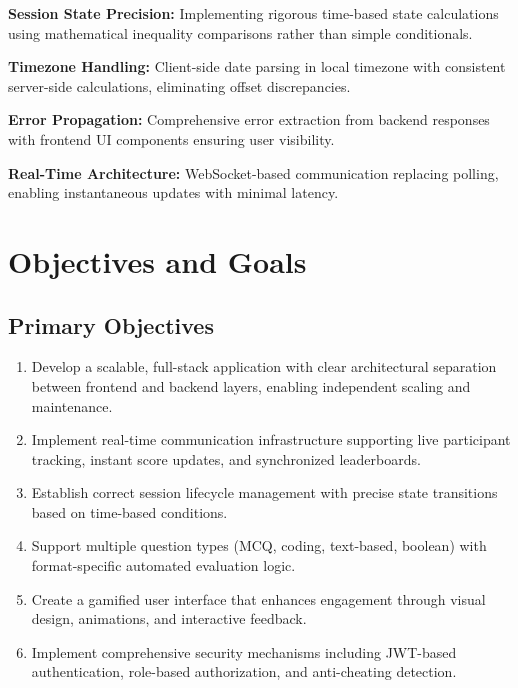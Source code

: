 \documentclass[12pt,a4paper]{report}
\newenvironment{reqbox}{%
  \begin{tcolorbox}[colback=lightgray,colframe=rulecol,
    leftrule=3pt,rightrule=0.4pt,toprule=0.4pt,bottomrule=0.4pt,
    arc=2pt,boxsep=2pt,left=4pt,right=4pt,top=3pt,bottom=3pt,breakable]
}{\end{tcolorbox}}
\begin{document}
\begin{reqbox}
  \textbf{Session State Precision:} Implementing rigorous time-based state calculations using mathematical inequality comparisons rather than simple conditionals.
  
  \textbf{Timezone Handling:} Client-side date parsing in local timezone with consistent server-side calculations, eliminating offset discrepancies.
  
  \textbf{Error Propagation:} Comprehensive error extraction from backend responses with frontend UI components ensuring user visibility.
  
  \textbf{Real-Time Architecture:} WebSocket-based communication replacing polling, enabling instantaneous updates with minimal latency.
\end{reqbox}

\cleardoublepage


\chapter{Objectives and Goals}

\section{Primary Objectives}

\begin{enumerate}[left=0pt]
  \item Develop a scalable, full-stack application with clear architectural separation between frontend and backend layers, enabling independent scaling and maintenance.
  
  \item Implement real-time communication infrastructure supporting live participant tracking, instant score updates, and synchronized leaderboards.
  
  \item Establish correct session lifecycle management with precise state transitions based on time-based conditions.
  
  \item Support multiple question types (MCQ, coding, text-based, boolean) with format-specific automated evaluation logic.
  
  \item Create a gamified user interface that enhances engagement through visual design, animations, and interactive feedback.
  
  \item Implement comprehensive security mechanisms including JWT-based authentication, role-based authorization, and anti-cheating detection.
\end{enumerate}
\end{document}
